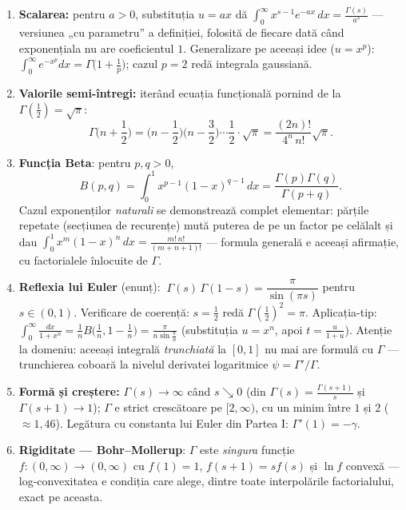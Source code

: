 \begin{teorema}
\begin{enumerate}[leftmargin=*, itemsep=2pt]
\item \textbf{Scalarea:} pentru $a>0$, substituția $u=ax$ dă
$\displaystyle\int_0^{\infty}x^{s-1}e^{-ax}\,dx=\frac{\Gamma(s)}{a^{s}}$
--- versiunea „cu parametru'' a definiției, folosită de fiecare dată când exponențiala nu are coeficientul $1$. Generalizare pe aceeași idee ($u=x^p$): $\int_0^\infty e^{-x^p}dx=\Gamma\big(1+\frac1p\big)$; cazul $p=2$ redă integrala gaussiană.
\item \textbf{Valorile semi-întregi:} iterând ecuația funcțională pornind de la $\Gamma(\frac12)=\sqrt\pi$:
\[
\Gamma\Big(n+\frac12\Big)=\Big(n-\frac12\Big)\Big(n-\frac32\Big)\cdots\frac12\cdot\sqrt\pi=\frac{(2n)!}{4^n\,n!}\sqrt{\pi}.
\]
\item \textbf{Funcția Beta}: pentru $p,q>0$,
\[
B(p,q)=\int_0^1x^{p-1}(1-x)^{q-1}\,dx=\frac{\Gamma(p)\Gamma(q)}{\Gamma(p+q)}.
\]
Cazul exponenților \emph{naturali} se demonstrează complet elementar: părțile repetate (secțiunea de recurențe) mută puterea de pe un factor pe celălalt și dau
$\int_0^1x^m(1-x)^n\,dx=\frac{m!\,n!}{(m+n+1)!}$ --- formula generală e aceeași afirmație, cu factorialele înlocuite de $\Gamma$.
\item \textbf{Reflexia lui Euler} (enunț): $\ \Gamma(s)\,\Gamma(1-s)=\dfrac{\pi}{\sin(\pi s)}$ pentru $s\in(0,1)$. Verificare de coerență: $s=\frac12$ redă $\Gamma(\frac12)^2=\pi$. Aplicația-tip: $\displaystyle\int_0^{\infty}\frac{dx}{1+x^n}=\frac1nB\Big(\frac1n,1-\frac1n\Big)=\frac{\pi}{n\sin\frac\pi n}$ (substituția $u=x^n$, apoi $t=\frac{u}{1+u}$). Atenție la domeniu: aceeași integrală \emph{trunchiată} la $[0,1]$ nu mai are formulă cu $\Gamma$ --- trunchierea coboară la nivelul derivatei logaritmice $\psi=\Gamma'/\Gamma$.
\item \textbf{Formă și creștere:} $\Gamma(s)\to\infty$ când $s\searrow0$ (din $\Gamma(s)=\frac{\Gamma(s+1)}{s}$ și $\Gamma(s+1)\to1$); $\Gamma$ e strict crescătoare pe $[2,\infty)$, cu un minim între $1$ și $2$ ($\approx1{,}46$). Legătura cu constanta lui Euler din Partea I: $\Gamma'(1)=-\gamma$.
\item \textbf{Rigiditate --- Bohr--Mollerup}: $\Gamma$ este \emph{singura} funcție $f:(0,\infty)\to(0,\infty)$ cu $f(1)=1$, $f(s+1)=sf(s)$ și $\ln f$ convexă --- log-convexitatea e condiția care alege, dintre toate interpolările factorialului, exact pe aceasta.
\end{enumerate}
\end{teorema}

